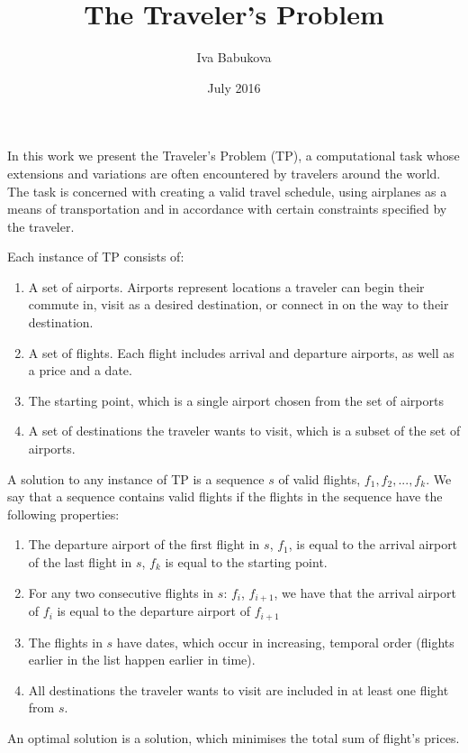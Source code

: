 \documentclass{article}
\title{The Traveler's Problem}
\author{Iva Babukova}
\date{July 2016}
\theoremstyle{definition}
\begin{document}
\maketitle
In this work we present the Traveler's Problem (TP), a computational task whose extensions and variations are often encountered by travelers around the world. The task is concerned with creating a valid travel schedule, using airplanes as a means of transportation and in accordance with certain constraints specified by the traveler.

Each instance of TP consists of:

\begin{enumerate}
\item A set of airports. Airports represent locations a traveler can begin their commute in, visit as a desired destination, or connect in on the way to their destination.
\item A set of flights. Each flight includes arrival and departure airports, as well as a price and a date.
\item The starting point, which is a single airport chosen from the set of airports
\item A set of destinations the traveler wants to visit, which is a subset of the set of airports.
\end{enumerate}

A solution to any instance of TP is a sequence $s$ of valid flights, ${f_{1}, f_{2}, ..., f_{k}}$. We say that a sequence contains valid flights if the flights in the sequence have the following properties:

\begin{enumerate}
\item The departure airport of the first flight in $s$, $f_{1}$, is equal to the arrival airport of the last flight in $s$, $f_{k}$ is equal to the starting point.
\item For any two consecutive flights in $s$: $f_{i}$, $f_{i+1}$, we have that the arrival airport of $f_{i}$ is equal to the departure airport of $f_{i+1}$
\item The flights in $s$ have dates, which occur in increasing, temporal order (flights earlier in the list happen earlier in time).
\item All destinations the traveler wants to visit are included in at least one flight from $s$.
\end{enumerate}

An optimal solution is a solution, which minimises the total sum of flight's prices.
\end{document}
